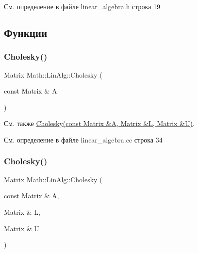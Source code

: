 См. определение в файле linear\+\_\+algebra.\+h строка 19



\subsection{Функции}
\hypertarget{namespace_math_1_1_lin_alg_a63d9cc41c4735dc5cefd2ec8880f432c}{}\label{namespace_math_1_1_lin_alg_a63d9cc41c4735dc5cefd2ec8880f432c} 
\subsubsection{\texorpdfstring{Cholesky()}{Cholesky()}\hspace{0.1cm}{\footnotesize\ttfamily [1/2]}}
{\footnotesize\ttfamily Matrix Math\+::\+Lin\+Alg\+::\+Cholesky (\begin{DoxyParamCaption}\item[{const Matrix \&}]{A }\end{DoxyParamCaption})}

\begin{DoxySeeAlso}{См. также}
\hyperlink{namespace_math_1_1_lin_alg_a980590dcd2dcd5557b299e7b5dfc1946}{Cholesky(const Matrix \&\+A, Matrix \&\+L, Matrix \&\+U)}. 
\end{DoxySeeAlso}


См. определение в файле linear\+\_\+algebra.\+cc строка 34

\hypertarget{namespace_math_1_1_lin_alg_a980590dcd2dcd5557b299e7b5dfc1946}{}\label{namespace_math_1_1_lin_alg_a980590dcd2dcd5557b299e7b5dfc1946} 
\subsubsection{\texorpdfstring{Cholesky()}{Cholesky()}\hspace{0.1cm}{\footnotesize\ttfamily [2/2]}}
{\footnotesize\ttfamily Matrix Math\+::\+Lin\+Alg\+::\+Cholesky (\begin{DoxyParamCaption}\item[{const Matrix \&}]{A,  }\item[{Matrix \&}]{L,  }\item[{Matrix \&}]{U }\end{DoxyParamCaption})}



